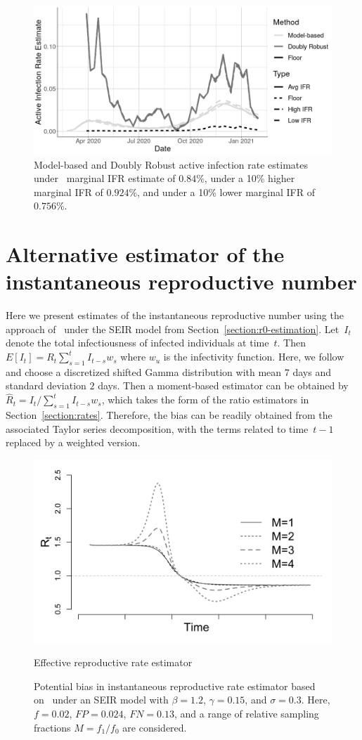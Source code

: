 \documentclass[11pt]{amsart}
\numberwithin{equation}{section}
\theoremstyle{plain}
\begin{document}
\begin{figure}[!th]
 \centering
 \includegraphics[width=.6\linewidth]{../figs/tv_air_sensitivity.png}
 \caption{Model-based and Doubly Robust active infection rate estimates under~\cite{Ironse2103272118} marginal IFR estimate of $0.84$\%, under a 10\% higher marginal IFR of $0.924$\%, and under a 10\% lower marginal IFR of $0.756$\%.}
 \label{fig:tv_air_sens}
\end{figure}

\section{Alternative estimator of the instantaneous reproductive number}
\label{app:cori_rt}

Here we present estimates of the instantaneous reproductive number using the approach of~\cite{Cori20113} under the SEIR model from Section~\ref{section:r0-estimation}.  Let~$I_t$ denote the total infectiousness of infected individuals at time~$t$.  Then~$E[I_t] = R_t \sum_{s=1}^{t} I_{t-s} w_s$ where $w_{u}$ is the infectivity function.  Here, we follow~\cite{Cori20113} and choose a discretized shifted Gamma distribution with mean $7$ days and standard deviation $2$ days.  Then a moment-based estimator can be obtained by $\hat R_t = I_t / \sum_{s=1}^t I_{t-s} w_s$, which takes the form of the ratio estimators in Section~\ref{section:rates}.  Therefore, the bias can be readily obtained from the associated Taylor series decomposition, with the terms related to time~$t-1$ replaced by a weighted version.


\begin{figure}
 \centering
  \includegraphics[width=.75\linewidth]{../figs/seir_cori_rt.png}
  \caption{Effective reproductive rate estimator}
 \caption{Potential bias in instantaneous reproductive rate estimator based on~\cite{Cori20113} under an SEIR model with $\beta = 1.2$, $\gamma = 0.15$, and $\sigma = 0.3$.  Here, $f = 0.02$, $FP = 0.024$, $FN = 0.13$, and a range of relative sampling fractions $M = f_1/f_0$ are considered.}
 \label{fig:cori-bias}
 \end{figure}
\end{document}
